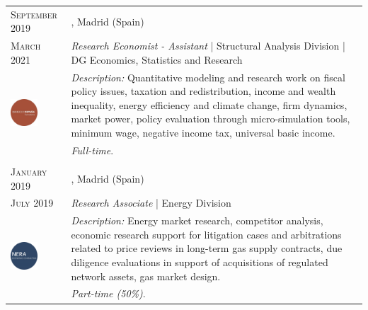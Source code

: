 \begin{longtable}{R{2.5cm}|p{14.8cm}}
 	 	\textsc{September 2019} & \textsc{}, \faMapMarker \hspace{0.5 mm} Madrid (Spain) \\
 	\textsc{March 2021} 	& \textit{Research Economist - Assistant} | Structural Analysis Division | DG Economics, Statistics and Research  \\
	 & 
 	\footnotesize{\faTasks \emph{ Description: }Quantitative modeling and research work on fiscal policy issues, taxation and redistribution, income and wealth inequality, energy efficiency and climate change, firm dynamics, market power, policy evaluation through micro-simulation tools, minimum wage, negative income tax, universal basic income.} \\ &
	\footnotesize{\faFileText \emph{ Full-time}.} \\
 	 \\
	
	 	\textsc{January 2019} & \textsc{}, \faMapMarker \hspace{0.5 mm} Madrid (Spain) \\
 	\textsc{July 2019} 	& \textit{Research Associate} | Energy Division   \\
	 & 
 	\footnotesize{\faTasks \emph{ Description: }Energy market research, competitor analysis, economic research support for litigation cases and arbitrations related to price reviews in long-term gas supply contracts, due diligence evaluations in support of acquisitions of regulated network assets, gas market design.} \\ &
	\footnotesize{\faFileText \emph{ Part-time (50\%)}.} \\
	
\end{longtable}

\vspace{2 mm}

